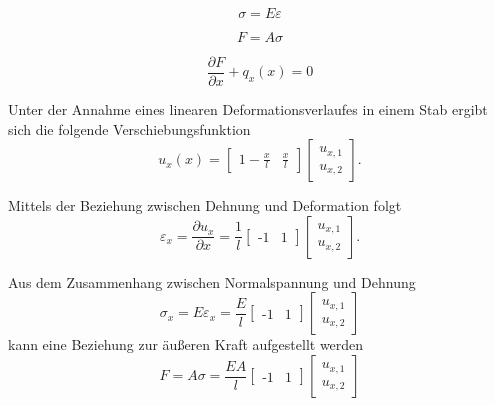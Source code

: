 


\begin{equation}
    \sigma = E \varepsilon
\end{equation}

\begin{equation}
    F = A \sigma
\end{equation}

\begin{equation}
    \frac{\partial F}{\partial x}+ q_x(x) = 0
\end{equation}

Unter der Annahme eines linearen Deformationsverlaufes in einem Stab ergibt sich die folgende Verschiebungsfunktion 
\begin{equation}
    u_x(x) = \begin{bmatrix} 1-\frac{x}{l} & \frac{x}{l} \end{bmatrix}\begin{bmatrix} 
        u_{x,1} \\
        u_{x,2} 
    \end{bmatrix}.
\end{equation}

Mittels der Beziehung zwischen Dehnung und Deformation folgt 
\begin{equation}
    \varepsilon_x = \frac{\partial u_x}{\partial x} = 
    \frac{1}{l}
    \begin{bmatrix} 
        \text{-}1 & 1 
    \end{bmatrix}
    \begin{bmatrix} 
        u_{x,1} \\
        u_{x,2} 
    \end{bmatrix}.
\end{equation}

Aus dem Zusammenhang zwischen Normalspannung und Dehnung
\begin{equation}
    \sigma_x = E \varepsilon_x = 
    \frac{E}{l}
    \begin{bmatrix} 
        \text{-}1 & 1 
    \end{bmatrix}
    \begin{bmatrix} 
        u_{x,1} \\
        u_{x,2} 
    \end{bmatrix}
\end{equation}
kann eine Beziehung zur äußeren Kraft aufgestellt werden
\begin{equation}
    F = A \sigma = 
    \frac{EA}{l}
    \begin{bmatrix} 
        \text{-}1 & 1 
    \end{bmatrix}
    \begin{bmatrix} 
        u_{x,1} \\
        u_{x,2} 
    \end{bmatrix}
\end{equation}

